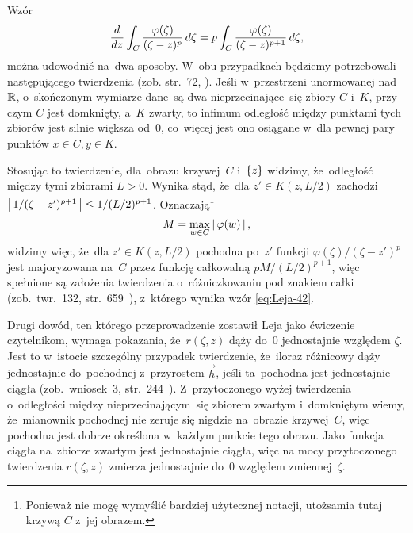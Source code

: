 \documentclass[a4paper,11pt]{article}
\begin{document}
\vspace{\spaceFour}


\start {} Wzór
\begin{equation}
  \label{eq:Leja-41}
  \frac{ d^{   } {   } }{ d {  z  }^{   } } \int_{ C } \frac{ \varphi( \zeta ) }{ ( \zeta - z )^{ p } }\,
  d\zeta
  = p \int_{ C } \frac{ \varphi( \zeta ) }{ ( \zeta - z )^{ p + 1 } }\, d\zeta,
\end{equation}
można udowodnić na~dwa sposoby. W~obu przypadkach będziemy
potrzebowali następującego twierdzenia (zob. str.~72,
\cite{SchwartzKursAnalizyMatematycznejTomI1979}). Jeśli w~przestrzeni
unormowanej nad~$\mathbb{R}$, o~skończonym wymiarze dane~są dwa
nieprzecinające~się zbiory $C$ i~$K$, przy czym $C$ jest domknięty,
a~$K$ zwarty, to infimum odległość między punktami tych zbiorów jest
silnie większa od~$0$, co~więcej jest ono osiągane w~dla pewnej pary
punktów $x \in C, y \in K$.

Stosując to twierdzenie, dla~obrazu krzywej~$C$ i~$\{  z  \}$ widzimy,
że~odległość między tymi zbiorami $L > 0$. Wynika stąd, że~dla
$z' \in K( z, L / 2 )$ zachodzi
$\left| \,  1 / ( \zeta - z' )^{ p + 1 }  \, \right| \leq 1 / ( L / 2 )^{ p + 1 }$.
Oznaczają\footnote{Ponieważ nie mogę wymyślić bardziej użytecznej
  notacji, utożsamia tutaj krzywą $C$ z~jej obrazem.}
\begin{equation}
  \label{eq:Leja-42}
  M = \max_{ w \in C } \left| \,  \varphi( w )  \, \right|,
\end{equation}
widzimy więc, że~dla $z' \in K( z, L / 2 )$ pochodna po~$z'$ funkcji
$\varphi( \zeta ) / ( \zeta - z' )^{ p }$ jest majoryzowana na~$C$ przez
funkcję całkowalną $p M / ( L / 2 )^{ p + 1 }$, więc spełnione są
założenia twierdzenia o~różniczkowaniu pod znakiem całki
(zob.~twr.~132,
str.~659~\cite{SchwartzKursAnalizyMatematycznejTomI1979}), z~którego
wynika wzór \eqref{eq:Leja-42}.

Drugi dowód, ten którego przeprowadzenie zostawił Leja jako ćwiczenie
czytelnikom, wymaga pokazania, że~$r( \zeta, z )$ dąży do~$0$
jednostajnie względem $\zeta$. Jest to w~istocie szczególny przypadek
twierdzenie, że~iloraz różnicowy dąży jednostajnie do~pochodnej
z~przyrostem $\vec{ h }$, jeśli ta~pochodna jest jednostajnie ciągła
(zob.~wniosek~3,
str.~244~\cite{SchwartzKursAnalizyMatematycznejTomI1979}).
Z~przytoczonego wyżej twierdzenia o~odległości między
nieprzecinającym~się zbiorem zwartym i~domkniętym wiemy, że~mianownik
pochodnej nie zeruje się nigdzie na~obrazie krzywej~$C$, więc pochodna
jest dobrze określona w~każdym punkcie tego obrazu. Jako funkcja
ciągła na~zbiorze zwartym jest jednostajnie ciągła, więc na mocy
przytoczonego twierdzenia $r( \zeta, z )$ zmierza jednostajnie do~$0$
względem zmiennej~$\zeta$.
\end{document}
